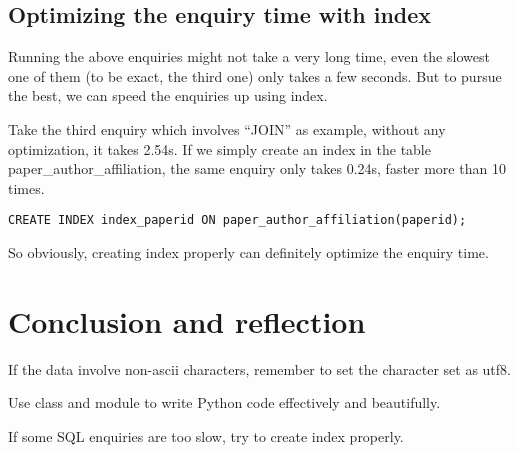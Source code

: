\documentclass{article}
\begin{document}
        \subsection{Optimizing the enquiry time with index}
Running the above enquiries might not take a very long time, even
the slowest one of them (to be exact, the third one) only takes a few
seconds. But to pursue the best, we can speed the enquiries up using
index.

Take the third enquiry which involves “JOIN” as example, without
any optimization, it takes 2.54s. If we simply create an index in the
table  paper\_author\_affiliation,  the  same  enquiry  only  takes  0.24s,
faster more than 10 times.
            \begin{verbatim}
CREATE INDEX index_paperid ON paper_author_affiliation(paperid);
            \end{verbatim}
So obviously, creating index properly can definitely optimize the
enquiry time.
    \section{Conclusion and reflection}
If  the  data  involve  non-ascii  characters,  remember  to  set  the
character set as utf8.

Use  class  and  module  to  write  Python  code  effectively  and
beautifully.

If some SQL enquiries are too slow, try to create index properly.
\end{document}
